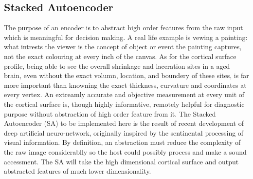 \subsection{Stacked Autoencoder}
The purpose of an encoder is to abstract high order features from the raw input which is meaningful for decision making. A real life example is vewing a painting: what intrests the viewer is the concept of object or event the painting captures, not the exact colouring at every inch of the canvas. As for the cortical surface profile, being able to see the overall shrinkage and laceration sites in a aged brain, even without the exact volumn, location, and boundery of these sites, is far more important than knowning the exact thickness, curvature and coordinates at every vertex. An extreamly accurate and objective measurement at every unit of the cortical surface is, though highly informative, remotely helpful for diagnostic purpose without abstraction of high order feature from it. The Stacked Autoencoder (SA) to be implemented here is the result of recent development of deep artificial neuro-network, originally inspired by the sentinental processing of visual information. By definition, an abstraction must reduce the complexity of the raw image  considerablly so the host could possibly process and make a sound accessment. The SA will take the high dimensional cortical surface and output abstracted features of much lower dimensionality.

